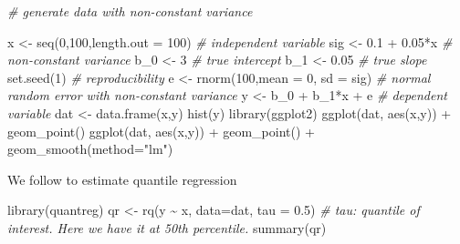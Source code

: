 \documentclass[
]{book}
\newenvironment{Shaded}{\begin{snugshade}}{\end{snugshade}}
\newcommand{\AttributeTok}[1]{\textcolor[rgb]{0.77,0.63,0.00}{#1}}
\newcommand{\CommentTok}[1]{\textcolor[rgb]{0.56,0.35,0.01}{\textit{#1}}}
\newcommand{\DecValTok}[1]{\textcolor[rgb]{0.00,0.00,0.81}{#1}}
\newcommand{\FloatTok}[1]{\textcolor[rgb]{0.00,0.00,0.81}{#1}}
\newcommand{\FunctionTok}[1]{\textcolor[rgb]{0.00,0.00,0.00}{#1}}
\newcommand{\NormalTok}[1]{#1}
\newcommand{\OtherTok}[1]{\textcolor[rgb]{0.56,0.35,0.01}{#1}}
\newcommand{\SpecialCharTok}[1]{\textcolor[rgb]{0.00,0.00,0.00}{#1}}
\newcommand{\StringTok}[1]{\textcolor[rgb]{0.31,0.60,0.02}{#1}}
\begin{document}
\begin{Shaded}
\begin{Highlighting}[]
\CommentTok{\# generate data with non{-}constant variance}

\NormalTok{x }\OtherTok{\textless{}{-}} \FunctionTok{seq}\NormalTok{(}\DecValTok{0}\NormalTok{,}\DecValTok{100}\NormalTok{,}\AttributeTok{length.out =} \DecValTok{100}\NormalTok{)        }\CommentTok{\# independent variable}
\NormalTok{sig }\OtherTok{\textless{}{-}} \FloatTok{0.1} \SpecialCharTok{+} \FloatTok{0.05}\SpecialCharTok{*}\NormalTok{x                     }\CommentTok{\# non{-}constant variance}
\NormalTok{b\_0 }\OtherTok{\textless{}{-}} \DecValTok{3}                                \CommentTok{\# true intercept}
\NormalTok{b\_1 }\OtherTok{\textless{}{-}} \FloatTok{0.05}                             \CommentTok{\# true slope}
\FunctionTok{set.seed}\NormalTok{(}\DecValTok{1}\NormalTok{)                             }\CommentTok{\# reproducibility}
\NormalTok{e }\OtherTok{\textless{}{-}} \FunctionTok{rnorm}\NormalTok{(}\DecValTok{100}\NormalTok{,}\AttributeTok{mean =} \DecValTok{0}\NormalTok{, }\AttributeTok{sd =}\NormalTok{ sig)      }\CommentTok{\# normal random error with non{-}constant variance}
\NormalTok{y }\OtherTok{\textless{}{-}}\NormalTok{ b\_0 }\SpecialCharTok{+}\NormalTok{ b\_1}\SpecialCharTok{*}\NormalTok{x }\SpecialCharTok{+}\NormalTok{ e                    }\CommentTok{\# dependent variable}
\NormalTok{dat }\OtherTok{\textless{}{-}} \FunctionTok{data.frame}\NormalTok{(x,y)}
\FunctionTok{hist}\NormalTok{(y)}
\FunctionTok{library}\NormalTok{(ggplot2)}
\FunctionTok{ggplot}\NormalTok{(dat, }\FunctionTok{aes}\NormalTok{(x,y)) }\SpecialCharTok{+} \FunctionTok{geom\_point}\NormalTok{()}
\FunctionTok{ggplot}\NormalTok{(dat, }\FunctionTok{aes}\NormalTok{(x,y)) }\SpecialCharTok{+} \FunctionTok{geom\_point}\NormalTok{() }\SpecialCharTok{+} \FunctionTok{geom\_smooth}\NormalTok{(}\AttributeTok{method=}\StringTok{"lm"}\NormalTok{)}
\end{Highlighting}
\end{Shaded}

We follow \citep{Roger_1996} to estimate quantile regression

\begin{Shaded}
\begin{Highlighting}[]
\FunctionTok{library}\NormalTok{(quantreg)}
\NormalTok{qr }\OtherTok{\textless{}{-}} \FunctionTok{rq}\NormalTok{(y }\SpecialCharTok{\textasciitilde{}}\NormalTok{ x, }\AttributeTok{data=}\NormalTok{dat, }\AttributeTok{tau =} \FloatTok{0.5}\NormalTok{) }\CommentTok{\# tau: quantile of interest. Here we have it at 50th percentile.}
\FunctionTok{summary}\NormalTok{(qr)}
\end{Highlighting}
\end{Shaded}
\end{document}
